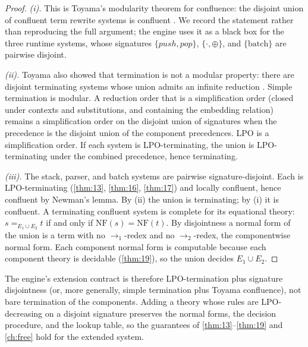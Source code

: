 \begin{proof}
\emph{(i).} This is Toyama's modularity theorem for confluence: the
disjoint union of confluent term rewrite systems is confluent
\citep{toyama}. We record the statement rather than reproducing the
full argument; the engine uses it as a black box for the three
runtime systems, whose signatures $\{\mathit{push},\mathit{pop}\}$,
$\{\cdot,\oplus\}$, and $\{\mathrm{batch}\}$ are pairwise disjoint.

\emph{(ii).} Toyama also showed that termination is not a modular
property: there are disjoint terminating systems whose union admits an
infinite reduction \citep{toyama}. Simple termination is modular. A
reduction order that is a simplification order (closed under contexts
and substitutions, and containing the embedding relation) remains a
simplification order on the disjoint union of signatures when the
precedence is the disjoint union of the component precedences. LPO is
a simplification order. If each system is LPO-terminating, the union
is LPO-terminating under the combined precedence, hence terminating.

\emph{(iii).} The stack, parser, and batch systems are pairwise
signature-disjoint. Each is LPO-terminating (\autoref{thm:13},
\autoref{thm:16}, \autoref{thm:17}) and locally confluent, hence
confluent by Newman's lemma. By (ii) the union is terminating; by (i)
it is confluent. A terminating confluent system is complete for its
equational theory: $s =_{E_1 \cup E_2} t$ if and only if
$\mathrm{NF} (s) = \mathrm{NF} (t)$. By disjointness a normal form of
the union is a term with no $\to_1$-redex and no $\to_2$-redex, the
componentwise normal form. Each component normal form is computable
because each component theory is decidable (\autoref{thm:19}), so the
union decides $E_1 \cup E_2$.
\end{proof}

\begin{remark}
The engine's extension contract is therefore LPO-termination plus
signature disjointness (or, more generally, simple termination plus
Toyama confluence), not bare termination of the components. Adding a
theory whose rules are LPO-decreasing on a disjoint signature
preserves the normal forms, the decision procedure, and the lookup
table, so the guarantees of \ref{thm:13}--\ref{thm:19} and
\autoref{ch:free} hold for the extended system.
\end{remark}
